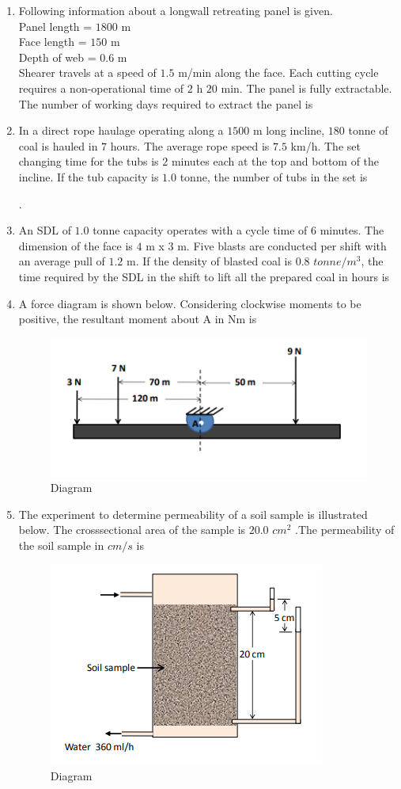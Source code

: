 \documentclass[journal,12pt,onecolumn]{IEEEtran}
\theoremstyle{remark}
\begin{document}
\begin{enumerate}
\hfill{}

\item Following information about a longwall retreating panel is given.\\
Panel length = $1800$ m\\
Face length = $150$ m\\
Depth of web = $0.6$ m\\
Shearer travels at a speed of $1.5$ m/min along the face.
Each cutting cycle requires a non-operational time of $2$ h $20$ min. The panel is fully
extractable. The number of working days required to extract the panel is

\hfill{}
\item In a direct rope haulage operating along a $1500$ m long incline, $180$ tonne of coal is hauled
in $7$ hours. The average rope speed is $7.5$ km/h. The set changing time for the tubs is $2$ minutes each at the top and bottom of the incline. If the tub capacity is $1.0$ tonne, the number of tubs in the set is

\hfill{}.
\item An SDL of $1.0$ tonne capacity operates with a cycle time of $6$ minutes. The dimension of the face is $4$ m x $3$ m. Five blasts are conducted per shift with an average pull of $1.2$ m. If the density of blasted coal is $0.8$ $tonne/m^3$, the time required by the SDL in the shift to lift all the prepared coal in hours is

\hfill{}

\item A force diagram is shown below. Considering clockwise moments to be positive, the resultant moment about A in Nm is
\begin{figure}[H]
  \centering
  \includegraphics[width=0.4\columnwidth]{figs/force.png}
  \caption{Diagram}
  \label{fig:force}
\end{figure}


\hfill{}
\item The experiment to determine permeability of a soil sample is illustrated below. The crosssectional area of the sample is $20.0$ $cm^2$ .The permeability of the soil sample in $cm/s$ is
\begin{figure}[H]
  \centering
  \includegraphics[width=0.4\columnwidth]{figs/ex.png}
  \caption{Diagram}
  \label{fig:eg}
\end{figure}


\end{enumerate}
\end{document}
